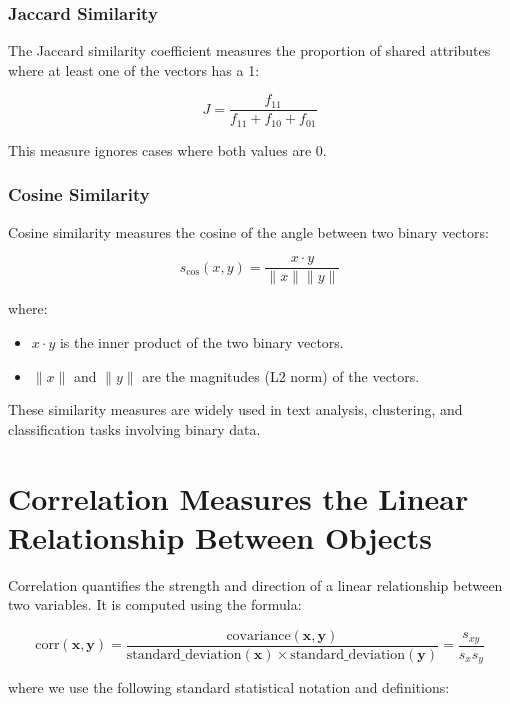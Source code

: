 \documentclass[a4paper,12pt]{article}
\begin{document}
\subsubsection{Jaccard Similarity}
The Jaccard similarity coefficient measures the proportion of shared attributes where at least one of the vectors has a 1:

\begin{equation}
J = \frac{f_{11}}{f_{11} + f_{10} + f_{01}}
\end{equation}

This measure ignores cases where both values are 0.

\subsubsection{Cosine Similarity}
Cosine similarity measures the cosine of the angle between two binary vectors:

\begin{equation}
s_{\cos}(x, y) = \frac{x \cdot y}{\|x\| \|y\|}
\end{equation}

where:
\begin{itemize}
    \item \( x \cdot y \) is the inner product of the two binary vectors.
    \item \( \|x\| \) and \( \|y\| \) are the magnitudes (L2 norm) of the vectors.
\end{itemize}

These similarity measures are widely used in text analysis, clustering, and classification tasks involving binary data.


\section{Correlation Measures the Linear Relationship Between Objects}

Correlation quantifies the strength and direction of a linear relationship between two variables. It is computed using the formula:

\begin{equation}
\text{corr}(\mathbf{x}, \mathbf{y}) = \frac{\text{covariance}(\mathbf{x}, \mathbf{y})}{\text{standard\_deviation}(\mathbf{x}) \times \text{standard\_deviation}(\mathbf{y})} = \frac{s_{xy}}{s_x s_y}
\end{equation}

where we use the following standard statistical notation and definitions:
\end{document}
